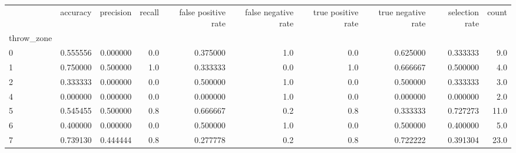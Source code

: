\begin{tabular}{lrrrrrrrrr}
\toprule
{} &  accuracy &  precision &  recall &  false positive rate &  false negative rate &  true positive rate &  true negative rate &  selection rate &  count \\
throw\_zone &           &            &         &                      &                      &                     &                     &                 &        \\
\midrule
0          &  0.555556 &   0.000000 &     0.0 &             0.375000 &                  1.0 &                 0.0 &            0.625000 &        0.333333 &    9.0 \\
1          &  0.750000 &   0.500000 &     1.0 &             0.333333 &                  0.0 &                 1.0 &            0.666667 &        0.500000 &    4.0 \\
2          &  0.333333 &   0.000000 &     0.0 &             0.500000 &                  1.0 &                 0.0 &            0.500000 &        0.333333 &    3.0 \\
4          &  0.000000 &   0.000000 &     0.0 &             0.000000 &                  1.0 &                 0.0 &            0.000000 &        0.000000 &    2.0 \\
5          &  0.545455 &   0.500000 &     0.8 &             0.666667 &                  0.2 &                 0.8 &            0.333333 &        0.727273 &   11.0 \\
6          &  0.400000 &   0.000000 &     0.0 &             0.500000 &                  1.0 &                 0.0 &            0.500000 &        0.400000 &    5.0 \\
7          &  0.739130 &   0.444444 &     0.8 &             0.277778 &                  0.2 &                 0.8 &            0.722222 &        0.391304 &   23.0 \\
\bottomrule
\end{tabular}
